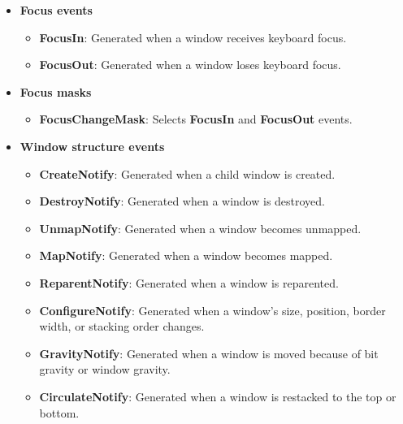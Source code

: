 \documentclass{report}
\begin{document}
\begin{itemize}
            \bigbreak \noindent
            \begin{itemize}
                \item \textbf{ExposureMask}: Selects \textbf{Expose} events.
                \item \textbf{VisibilityChangeMask}: Selects \textbf{VisibilityNotify} events.
            \end{itemize}
        \item \textbf{Focus events}
            \bigbreak \noindent
            \begin{itemize}
                \item \textbf{FocusIn}: Generated when a window receives keyboard focus.
                \item \textbf{FocusOut}: Generated when a window loses keyboard focus.
            \end{itemize}
        \item \textbf{Focus masks}
            \bigbreak \noindent
            \begin{itemize}
                \item \textbf{FocusChangeMask}: Selects \textbf{FocusIn} and \textbf{FocusOut} events.
            \end{itemize}
        \item \textbf{Window structure events}
            \bigbreak \noindent
            \begin{itemize}
                \item \textbf{CreateNotify}: Generated when a child window is created.
                \item \textbf{DestroyNotify}: Generated when a window is destroyed.
                \item \textbf{UnmapNotify}: Generated when a window becomes unmapped.
                \item \textbf{MapNotify}: Generated when a window becomes mapped.
                \item \textbf{ReparentNotify}: Generated when a window is reparented.
                \item \textbf{ConfigureNotify}: Generated when a window's size, position, border width, or stacking order changes.
                \item \textbf{GravityNotify}: Generated when a window is moved because of bit gravity or window gravity.
                \item \textbf{CirculateNotify}: Generated when a window is restacked to the top or bottom.
            \end{itemize}

\end{itemize}
\end{document}
